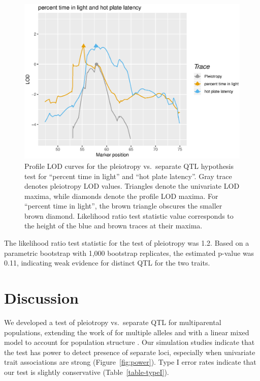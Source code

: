 \documentclass[12pt,twoside, lineno]{gsajnl}
\begin{document}
\begin{figure}
\includegraphics[width = \textwidth]{../Rmd/profile.eps}
\caption{Profile LOD curves for the pleiotropy vs.\ separate QTL
  hypothesis test for ``percent time in light'' and ``hot plate latency''.
  Gray trace denotes pleiotropy LOD values. Triangles denote the
  univariate LOD maxima, while diamonds denote the profile LOD maxima.
  For ``percent time in light'', the brown triangle obscures the
  smaller brown diamond. Likelihood ratio test statistic value
  corresponds to the height of the blue and brown traces at their
  maxima.}
\label{fig:profiles}
\end{figure}

The likelihood ratio test statistic for the test of pleiotropy was
1.2. Based on a parametric bootstrap with 1,000 bootstrap replicates,
the estimated p-value was 0.11, indicating weak
evidence for distinct QTL for the two traits.









\section{Discussion}

We developed a test of pleiotropy vs.\ separate QTL for multiparental
populations, extending the work of \citet{jiang1995multiple} for
multiple alleles and with a linear mixed model to account for
population structure \citep{kang2010variance, yang2014advantages}. Our simulation
studies indicate that the test has power to detect presence of
separate loci, especially when univariate trait associations are
strong (Figure~\ref{fig:power}). Type I error rates indicate that our
test is slightly conservative (Table~\ref{table-typeI}).
\end{document}
